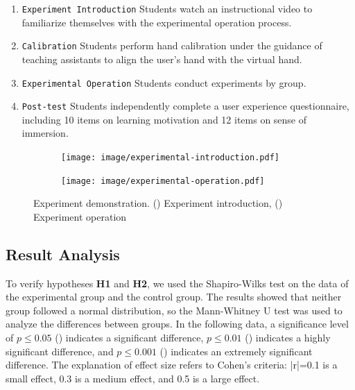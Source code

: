 \documentclass[runningheads]{llncs}
\begin{document}
\begin{enumerate}[label={\arabic*)}]
  \item \texttt{Experiment Introduction} Students watch an instructional video to familiarize themselves with the experimental operation process.
  \item \texttt{Calibration} Students perform hand calibration under the guidance of teaching assistants to align the user's hand with the virtual hand.
  \item \texttt{Experimental Operation} Students conduct experiments by group.
  \item \texttt{Post-test} Students independently complete a user experience questionnaire, including 10 items on learning motivation and 12 items on sense of immersion.
\end{enumerate}

\begin{figure}
  \begin{subfigure}{0.48\linewidth}
  \centering
  \texttt{[image: image/experimental-introduction.pdf]}
  \caption{}
  \label{fig:experimental-introduction}
  \end{subfigure}
  \hfill
  \begin{subfigure}{0.48\linewidth}
  \centering
  \texttt{[image: image/experimental-operation.pdf]}
  \caption{}
  \label{fig:experimental-operation}
  \end{subfigure}
  \caption{Experiment demonstration. () Experiment introduction, () Experiment operation}
  \label{fig:experimental-procedure}
\end{figure}

\subsection{Result Analysis}
To verify hypotheses \textbf{H1} and \textbf{H2}, we used the Shapiro-Wilks test on the data of the experimental group and the control group. The results showed that neither group followed a normal distribution, so the Mann-Whitney U test was used to analyze the differences between groups. In the following data, a significance level of \(p \le 0.05\) () indicates a significant difference, \(p \le 0.01\) () indicates a highly significant difference, and \(p \le 0.001\) () indicates an extremely significant difference. The explanation of effect size refers to Cohen's criteria: |r|=0.1 is a small effect, 0.3 is a medium effect, and 0.5 is a large effect.
\end{document}
